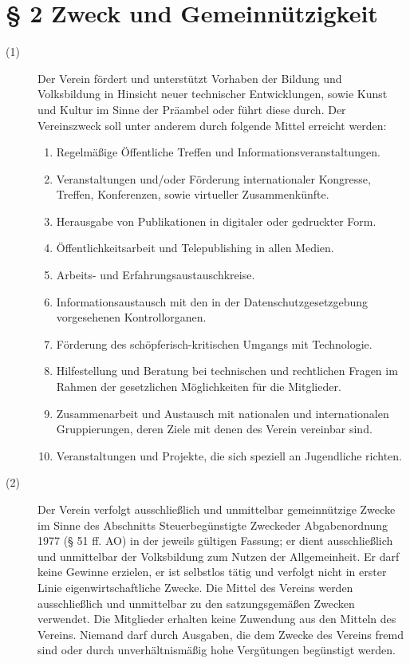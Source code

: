 \documentclass[12pt,paper=a4,ngerman]{scrreprt}
\begin{document}
\section{\S{} 2 Zweck und Gemeinnützigkeit}
\begin{description}
	\item[(1)] Der Verein fördert und unterstützt Vorhaben der Bildung und Volksbildung in Hinsicht neuer technischer Entwicklungen, sowie Kunst und Kultur im Sinne der Präambel oder führt diese durch. Der Vereinszweck soll unter anderem durch folgende Mittel erreicht werden:
	\begin{enumerate}
		\item Regelmäßige Öffentliche Treffen und Informationsveranstaltungen.
		\item Veranstaltungen und/oder Förderung internationaler Kongresse, Treffen, Konferenzen, sowie virtueller Zusammenkünfte.
		\item Herausgabe von Publikationen in digitaler oder gedruckter Form.
		\item Öffentlichkeitsarbeit und Telepublishing in allen Medien.
		\item Arbeits- und Erfahrungsaustauschkreise.
		\item Informationsaustausch mit den in der Datenschutzgesetzgebung vorgesehenen Kontrollorganen.
		\item Förderung des schöpferisch-kritischen Umgangs mit Technologie.
		\item Hilfestellung und Beratung bei technischen und rechtlichen Fragen im Rahmen der gesetzlichen Möglichkeiten für die Mitglieder.
		\item Zusammenarbeit und Austausch mit nationalen und internationalen Gruppierungen, deren Ziele mit denen des Verein vereinbar sind.
		\item Veranstaltungen und Projekte, die sich speziell an Jugendliche richten.
	\end{enumerate}
\item[(2)] Der Verein verfolgt ausschließlich und unmittelbar gemeinnützige Zwecke im Sinne des Abschnitts \grqq Steuerbegünstigte Zwecke\grqq der Abgabenordnung 1977 (§ 51 ff. AO) in der jeweils gültigen Fassung; er dient ausschließlich und unmittelbar der Volksbildung zum Nutzen der Allgemeinheit. Er darf keine Gewinne erzielen, er ist selbstlos tätig und verfolgt nicht in erster Linie eigenwirtschaftliche Zwecke. Die Mittel des Vereins werden ausschließlich und unmittelbar zu den satzungsgemäßen Zwecken verwendet. Die Mitglieder erhalten keine Zuwendung aus den Mitteln des Vereins. Niemand darf durch Ausgaben, die dem Zwecke des Vereins fremd sind oder durch unverhältnismäßig hohe Vergütungen begünstigt werden.
\end{description}
\end{document}
